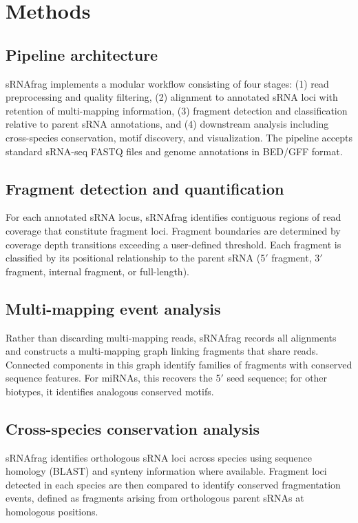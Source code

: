 \documentclass[11pt]{article}
\begin{document}
\section{Methods}

\subsection{Pipeline architecture}

sRNAfrag implements a modular workflow consisting of four stages: (1) read preprocessing and quality filtering, (2) alignment to annotated sRNA loci with retention of multi-mapping information, (3) fragment detection and classification relative to parent sRNA annotations, and (4) downstream analysis including cross-species conservation, motif discovery, and visualization. The pipeline accepts standard sRNA-seq FASTQ files and genome annotations in BED/GFF format.

\subsection{Fragment detection and quantification}

For each annotated sRNA locus, sRNAfrag identifies contiguous regions of read coverage that constitute fragment loci. Fragment boundaries are determined by coverage depth transitions exceeding a user-defined threshold. Each fragment is classified by its positional relationship to the parent sRNA (5$'$ fragment, 3$'$ fragment, internal fragment, or full-length).

\subsection{Multi-mapping event analysis}

Rather than discarding multi-mapping reads, sRNAfrag records all alignments and constructs a multi-mapping graph linking fragments that share reads. Connected components in this graph identify families of fragments with conserved sequence features. For miRNAs, this recovers the 5$'$ seed sequence; for other biotypes, it identifies analogous conserved motifs.

\subsection{Cross-species conservation analysis}

sRNAfrag identifies orthologous sRNA loci across species using sequence homology (BLAST) and synteny information where available. Fragment loci detected in each species are then compared to identify conserved fragmentation events, defined as fragments arising from orthologous parent sRNAs at homologous positions.
\end{document}
